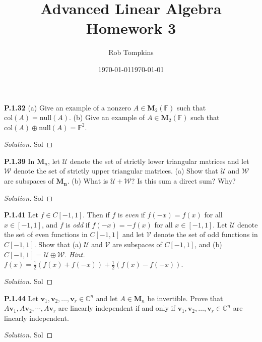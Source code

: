 \documentclass[12pt]{amsart}
\title{Advanced Linear Algebra\\Homework 3}
\author{Rob Tompkins}
\date{\today}
\newenvironment{solution}
{\begin{proof}[Solution]}
{\end{proof}}
\begin{document}
    \maketitle
    \date{\today}
    \begin{onehalfspace}

        \noindent\textbf{P.1.32} (a) Give an example of a nonzero $A\in\mathbf{M}_2(\mathbb{F})$ such that
        $\text{col}(A) = \text{null}(A)$.
        (b) Give an example of $A\in\mathbf{M}_2(\mathbb{F})$ such that
        $\text{col}(A)\oplus\text{null}(A) = \mathbb{F}^2$.
        \begin{solution}
            Sol
        \end{solution}

        \noindent\textbf{P.1.39} In $\mathbf{M}_n$, let $\mathcal{U}$ denote the set of strictly lower
        triangular matrices and let $\mathcal{W}$ denote the set of strictly upper triangular matrices.
        (a) Show that $\mathcal{U}$ and $\mathcal{W}$ are subspaces of $\mathbf{M_n}$.
        (b) What is $\mathcal{U} + \mathcal{W}$? Is this sum a direct sum? Why?
        \begin{solution}
            Sol
        \end{solution}

        \noindent\textbf{P.1.41} Let $f\in C[-1,1]$. Then if $f$ is \emph{even} if $f(-x) = f(x)$ for all $x\in[-1, 1]$,
        and $f$ is \emph{odd} if $f(-x) = -f(x)$ for all $x\in[-1,1]$.
        Let $\mathcal{U}$ denote the set of even functions in $C[-1,1]$ and let $\mathcal{V}$ denote the set of odd
        functions in $C[-1,1]$.
        Show that (a) $\mathcal{U}$ and $\mathcal{V}$ are subspaces of $C[-1,1]$, and (b)
        $C[-1,1] = \mathcal{U}\oplus\mathcal{W}$.
        \emph{Hint.} $f(x) = \frac{1}{2}(f(x)+f(-x)) + \frac{1}{2}(f(x) - f(-x))$.
        \begin{solution}
            Sol
        \end{solution}

        \noindent\textbf{P.1.44} Let $\mathbf{v}_1, \mathbf{v}_2, \ldots, \mathbf{v}_r \in \mathbb{C}^n$ and let
        $A\in\mathbf{M}_n$ be invertible.
        Prove that $A\mathbf{v}_1, A\mathbf{v}_2, \cdots, A\mathbf{v}_r$ are linearly independent if and only if
        $\mathbf{v}_1, \mathbf{v}_2, \ldots, \mathbf{v}_r \in \mathbb{C}^n$ are linearly independent.
        \begin{solution}
            Sol
        \end{solution}


\end{onehalfspace}
\end{document}
